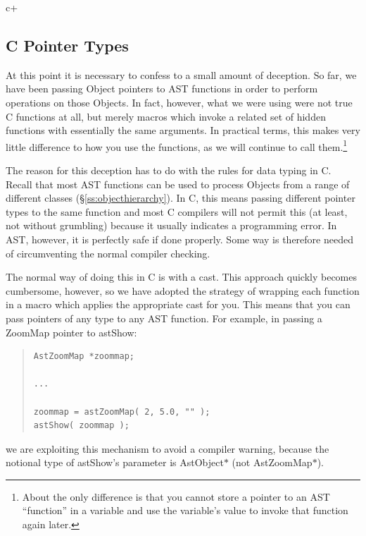 \documentclass[twoside,11pt]{article}
\newcommand{\secref}[1]{\S\ref{#1}}
\newcommand{\secref}[1]{\ref{#1}}
\begin{document}

c+
\subsection{C Pointer Types}

At this point it is necessary to confess to a small amount of
deception. So far, we have been passing Object pointers to AST
functions in order to perform operations on those Objects. In fact,
however, what we were using were not true C functions at all, but
merely macros which invoke a related set of hidden functions with
essentially the same arguments. In practical terms, this makes very
little difference to how you use the functions, as we will continue to
call them.\footnote{About the only difference is that you cannot store
a pointer to an AST ``function'' in a variable and use the variable's
value to invoke that function again later.}

The reason for this deception has to do with the rules for data typing
in C. Recall that most AST functions can be used to process Objects
from a range of different classes (\secref{ss:objecthierarchy}). In C,
this means passing different pointer types to the same function and
most C compilers will not permit this (at least, not without
grumbling) because it usually indicates a programming error. In AST,
however, it is perfectly safe if done properly. Some way is therefore
needed of circumventing the normal compiler checking.

The normal way of doing this in C is with a cast. This approach
quickly becomes cumbersome, however, so we have adopted the strategy
of wrapping each function in a macro which applies the appropriate
cast for you. This means that you can pass pointers of any type to any
AST function. For example, in passing a ZoomMap pointer to astShow:

\begin{quote}
\small
\begin{verbatim}
AstZoomMap *zoommap;

...

zoommap = astZoomMap( 2, 5.0, "" );
astShow( zoommap );
\end{verbatim}
\normalsize
\end{quote}

we are exploiting this mechanism to avoid a compiler warning, because
the notional type of astShow's parameter is AstObject$*$ (not
AstZoomMap$*$).
\end{document}
